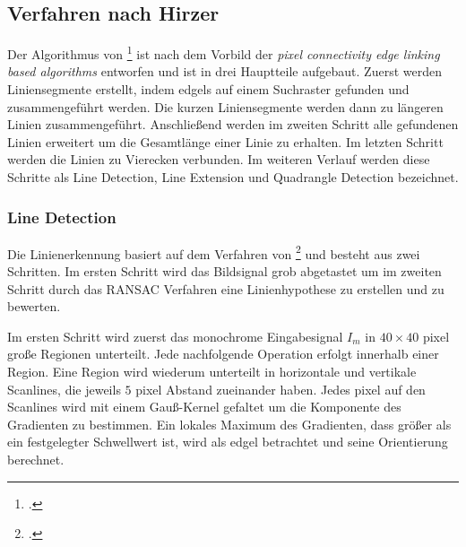 


\subsection{Verfahren nach Hirzer} %
\label{sub:verfahren_nach_hirzer}

Der Algorithmus von \citeauthor{hirzer08}\footcite{hirzer08} ist nach dem Vorbild der \textit{pixel connectivity edge
 linking based algorithms} entworfen und ist in drei Hauptteile aufgebaut. Zuerst werden Liniensegmente erstellt,
 indem \glspl{edgel} auf einem Suchraster gefunden und zusammengeführt werden. Die kurzen Liniensegmente werden dann zu
 längeren Linien zusammengeführt. Anschließend werden im zweiten Schritt alle gefundenen Linien erweitert um die
 Gesamtlänge einer Linie zu erhalten. Im letzten Schritt werden die Linien zu Vierecken verbunden. Im weiteren Verlauf
 werden diese Schritte als Line Detection, Line Extension und Quadrangle Detection bezeichnet.

\subsubsection{Line Detection} %
\label{sub:line_detection}
Die Linienerkennung basiert auf dem Verfahren von \citeauthor{clarke96}\footcite{clarke96} und besteht aus zwei
 Schritten. Im ersten Schritt wird das Bildsignal grob abgetastet um im zweiten Schritt durch das RANSAC Verfahren eine
 Linienhypothese zu erstellen und zu bewerten.

Im ersten Schritt wird zuerst das monochrome Eingabesignal $I_m$ in $40 \times 40$ \gls{pixel} große Regionen
 unterteilt. Jede nachfolgende Operation erfolgt innerhalb einer Region. Eine Region wird wiederum unterteilt in
 horizontale und vertikale Scanlines, die jeweils $5$ \gls{pixel} Abstand zueinander haben. Jedes \gls{pixel} auf den
 Scanlines wird mit einem Gauß-Kernel gefaltet um die Komponente des Gradienten zu bestimmen. Ein lokales Maximum des
 Gradienten, dass größer als ein festgelegter Schwellwert ist, wird als \gls{edgel} betrachtet und seine Orientierung
 berechnet.

